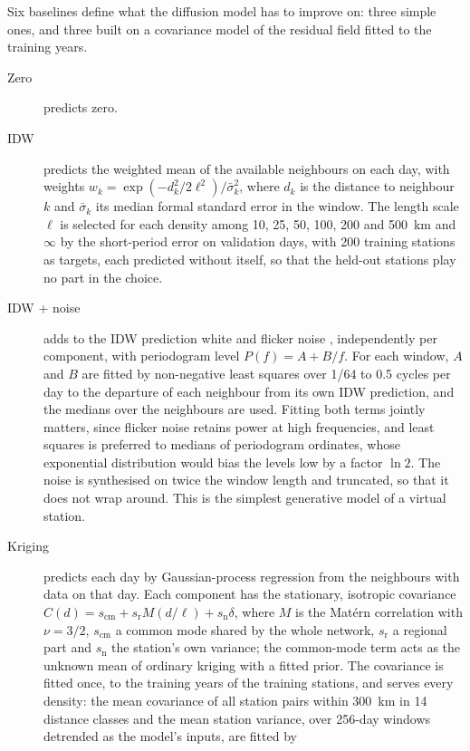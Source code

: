 \documentclass[preprint,12pt,authoryear]{elsarticle}
\begin{document}
Six baselines define what the diffusion model has to improve on: three simple ones, and
three built on a covariance model of the residual field fitted to the training years.
\begin{description}
  \item[Zero] predicts zero.
  \item[IDW] predicts the weighted mean of the available neighbours on each day, with
    weights $w_k = \exp(-d_k^2 / 2\ell^2) / \bar\sigma_k^2$, where $d_k$ is the distance
    to neighbour $k$ and $\bar\sigma_k$ its median formal standard error in the window.
    The length scale $\ell$ is selected for each density among 10, 25, 50, 100, 200 and
    500~km and $\infty$ by the short-period error on validation days, with 200 training
    stations as targets, each predicted without itself, so that the held-out stations
    play no part in the choice.
  \item[IDW + noise] adds to the IDW prediction white and flicker noise
    \citep{williams2004}, independently per component, with periodogram level $P(f) = A +
    B/f$. For each window, $A$ and $B$ are fitted by non-negative least squares over 1/64
    to 0.5 cycles per day to the departure of each neighbour from its own IDW prediction,
    and the medians over the neighbours are used. Fitting both terms jointly matters,
    since flicker noise retains power at high frequencies, and least squares is preferred
    to medians of periodogram ordinates, whose exponential distribution would bias the
    levels low by a factor $\ln 2$. The noise is synthesised on twice the window length
    and truncated, so that it does not wrap around. This is the simplest generative model
    of a virtual station.
  \item[Kriging] predicts each day by Gaussian-process regression \citep{rasmussen2006}
    from the neighbours with data on that day. Each component has the stationary,
    isotropic covariance $C(d) = s_\mathrm{cm} + s_\mathrm{r} M(d/\ell) + s_\mathrm{n}
    \delta$, where $M$ is the Mat\'ern correlation with $\nu = 3/2$, $s_\mathrm{cm}$ a
    common mode shared by the whole network, $s_\mathrm{r}$ a regional part and
    $s_\mathrm{n}$ the station's own variance; the common-mode term acts as the unknown
    mean of ordinary kriging with a fitted prior. The covariance is fitted once, to the
    training years of the training stations, and serves every density: the mean
    covariance of all station pairs within 300~km in 14 distance classes and the mean
    station variance, over 256-day windows detrended as the model's inputs, are fitted by

\end{description}
\end{document}

